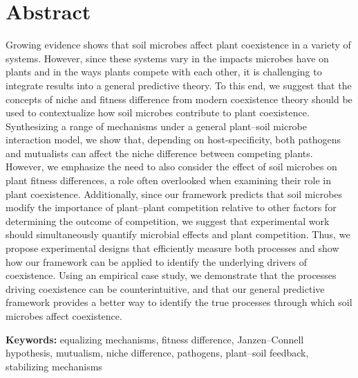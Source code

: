 \section{Abstract}
Growing evidence shows that soil microbes affect plant coexistence in a variety of systems. However, since these systems vary in the impacts microbes have on plants and in the ways plants compete with each other, it is challenging to integrate results into a general predictive theory.
To this end, we suggest that the concepts of niche and fitness difference from modern coexistence theory should be used to contextualize how soil microbes contribute to plant coexistence. Synthesizing a range of mechanisms under a general plant--soil microbe interaction model, we show that, depending on host-specificity, both pathogens and mutualists can affect the niche difference between competing plants.
However, we emphasize the need to also consider the effect of soil microbes on plant fitness differences, a role often overlooked when examining their role in plant coexistence.
Additionally, since our framework predicts that soil microbes modify the importance of plant--plant competition relative to other factors for determining the outcome of competition, we suggest that experimental work should simultaneously quantify microbial effects and plant competition. Thus, we propose experimental designs that efficiently measure both processes and show how our framework can be applied to identify the underlying drivers of coexistence. Using an empirical case study, we demonstrate that the processes driving coexistence can be counterintuitive, and that our general predictive framework provides a better way to identify the true processes through which soil microbes affect coexistence.
\medskip


\noindent \textbf{Keywords:} equalizing mechanisms, fitness difference, Janzen--Connell hypothesis, mutualism, niche difference, pathogens, plant--soil feedback, stabilizing mechanisms



